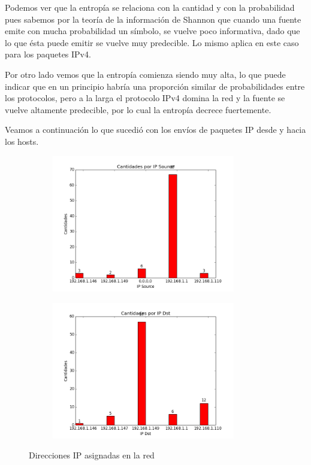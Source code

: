 Podemos ver que la entrop\'ia se relaciona con la cantidad y con la probabilidad pues sabemos por la teor\'ia de la informaci\'on de Shannon que cuando una fuente emite con mucha probabilidad un s\'imbolo, se vuelve poco informativa, dado que lo que \'esta puede emitir se vuelve muy predecible. Lo mismo aplica en este caso para los paquetes IPv4.\newline

Por otro lado vemos que la entrop\'ia comienza siendo muy alta, lo que puede indicar que en un principio habr\'ia una proporci\'on similar de probabilidades entre los protocolos, pero a la larga el protocolo IPv4 domina la red y la fuente se vuelve altamente predecible, por lo cual la entrop\'ia decrece fuertemente.\newline


Veamos a continuaci\'on lo que sucedi\'o con los env\'ios de paquetes IP desde y hacia los hosts.




\begin{figure}[H]

\begin{subfigure}{0.6\textwidth}
\includegraphics[width=0.9\linewidth, height=6cm]{imagenes/exp1/4cantidadIPSource} 
\caption{}
\end{subfigure}
\begin{subfigure}{0.6\textwidth}
\includegraphics[width=0.9\linewidth, height=6cm]{imagenes/exp1/5cantidadIPDst}
\caption{}
\end{subfigure}

\caption{Direcciones IP asignadas en la red}
\label{fig:1}
\end{figure}

